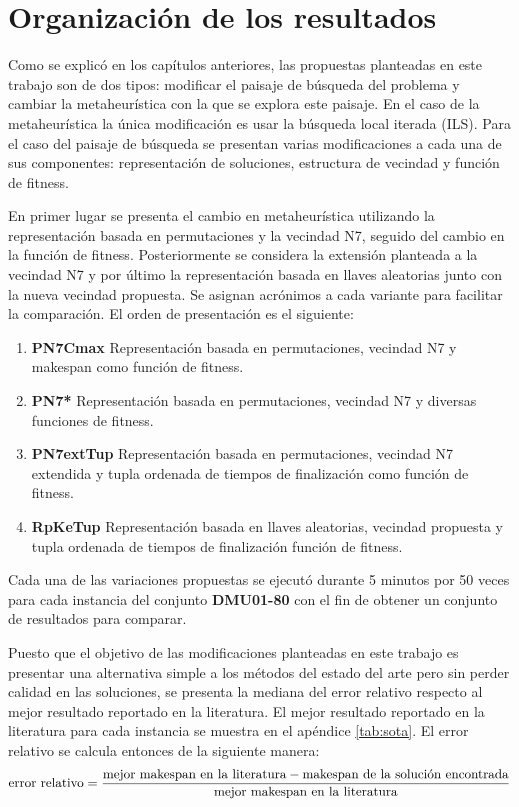 \section{Organización de los resultados}
Como se explicó en los capítulos anteriores, las propuestas planteadas en este trabajo son de dos tipos: modificar el paisaje de búsqueda del problema y cambiar la metaheurística con la que se explora este paisaje.
En el caso de la metaheurística la única modificación es usar la búsqueda local iterada (ILS). Para el caso del paisaje de búsqueda se presentan varias modificaciones a cada una de sus componentes: representación de soluciones, estructura de vecindad y función de fitness.

En primer lugar se presenta el cambio en metaheurística utilizando la representación basada en permutaciones y la vecindad N7, seguido del cambio en la función de fitness. Posteriormente se considera la extensión planteada a la vecindad N7 y por último la representación basada en llaves aleatorias junto con la nueva vecindad propuesta. Se asignan acrónimos a cada variante para facilitar la comparación. El orden de presentación es el siguiente:
\begin{enumerate}
    \item \textbf{PN7Cmax} Representación basada en permutaciones, vecindad N7 y makespan como función de fitness.
    \item \textbf{PN7*} Representación basada en permutaciones, vecindad N7 y diversas funciones de fitness.
    \item \textbf{PN7extTup} Representación basada en permutaciones, vecindad N7 extendida y tupla ordenada de tiempos de finalización como función de fitness.
    \item \textbf{RpKeTup} Representación basada en llaves aleatorias, vecindad propuesta y tupla ordenada de tiempos de finalización función de fitness.
\end{enumerate}

Cada una de las variaciones propuestas se ejecutó durante 5 minutos por 50 veces para cada instancia del conjunto \textbf{DMU01-80} con el fin de obtener un conjunto de resultados para comparar.

Puesto que el objetivo de las modificaciones planteadas en este trabajo es presentar una alternativa simple a los métodos del estado del arte pero sin perder calidad en las soluciones, se presenta la mediana del error relativo respecto al mejor resultado reportado en la literatura. El mejor resultado reportado en la literatura para cada instancia se muestra en el apéndice \ref{tab:sota}.
El error relativo se calcula entonces de la siguiente manera: \[\text{error relativo}= \frac{\text{mejor makespan en la literatura}-\text{makespan de la solución encontrada}}{\text{\text{mejor makespan en la literatura}}}\]

